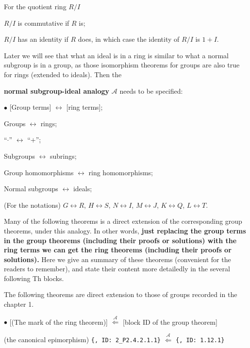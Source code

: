 \documentclass{article}
\begin{document}
\begin{Rmk}{}
    \textcolor{Th}{For the quotient ring $R/I$
    \begin{compactenum}
        \item $R/I$ is commutative if $R$ is;
        \item $R/I$ has an identity if $R$ does, in which case the identity of $R/I$ is $1+I$.
    \end{compactenum}}
    Later we will see that what an ideal is in a ring is similar to what a normal subgroup is in a group, as those isomorphism theorems for groups are also true for rings (extended to ideals). Then the \textcolor{Df}{\textbf{normal subgroup-ideal analogy} $\mathcal{A}$ needs to be specified:
    \begin{compactenum}
        \item[$\bullet$] [Group terms] $\leftrightarrow$ [ring terms];
        \item Groups $\leftrightarrow$ rings;
        \item ``$\cdot$'' $\leftrightarrow$ ``$+$'';
        \item Subgroups $\leftrightarrow$ subrings;
        \item Group homomorphisms $\leftrightarrow$ ring homomorphisms;
        \item Normal subgroups $\leftrightarrow$ ideals;
        \item (For the notations) $G\leftrightarrow R$, $H\leftrightarrow S$, $N\leftrightarrow I$, $M\leftrightarrow J$, $K\leftrightarrow Q$, $L\leftrightarrow T$.
    \end{compactenum}}
    Many of the following theorems is a direct extension of the corresponding group theorems, under this analogy. In other words, \textbf{just replacing the group terms in the group theorems (including their proofs or solutions) with the ring terms we can get the ring theorems (including their proofs or solutions).} Here we give an summary of these theorems (convenient for the readers to remember), and state their content more detailedly in the several following Th blocks.
    \begin{Rmk}{}
        The following theorems are direct extension to those of groups recorded in the chapter 1.
        \begin{compactenum}
            \item[$\bullet$] [(The mark of the ring theorem)] $\overset{\mathcal{A}}{\Longleftarrow}$ [block ID of the group theorem]
            \item (the canonical epimorphism) \verb|{, ID: 2_P2.4.2.1.1}| $\overset{\mathcal{A}}{\Longleftarrow}$ \verb|{, ID: 1.12.1}|

\end{compactenum}
\end{Rmk}
\end{Rmk}
\end{document}
